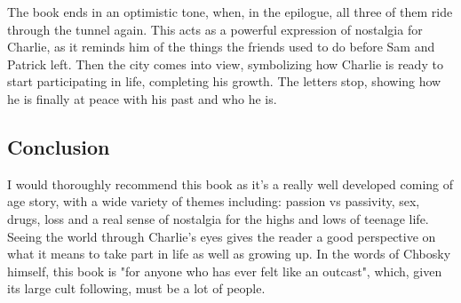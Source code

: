 	The book ends in an optimistic tone, when, in the epilogue, all three of them ride through the tunnel again. This acts as a powerful expression of nostalgia for Charlie, as it reminds him of the things the friends used to do before Sam and Patrick left. Then the city comes into view, symbolizing how Charlie is ready to start participating in life, completing his growth. The letters stop, showing how he is finally at peace with his  past and who he is.

\subsection{Conclusion}

	I would thoroughly recommend this book as it's a really well developed coming of age story, with a wide variety of themes including: passion vs passivity, sex, drugs, loss and a real sense of nostalgia for the highs and lows of teenage life. Seeing the world through Charlie's eyes gives the reader a good perspective on what it means to take part in life as well as growing up. In the words of Chbosky himself, this book is "for anyone who has ever felt like an outcast", which, given its large cult following, must be a lot of people.
